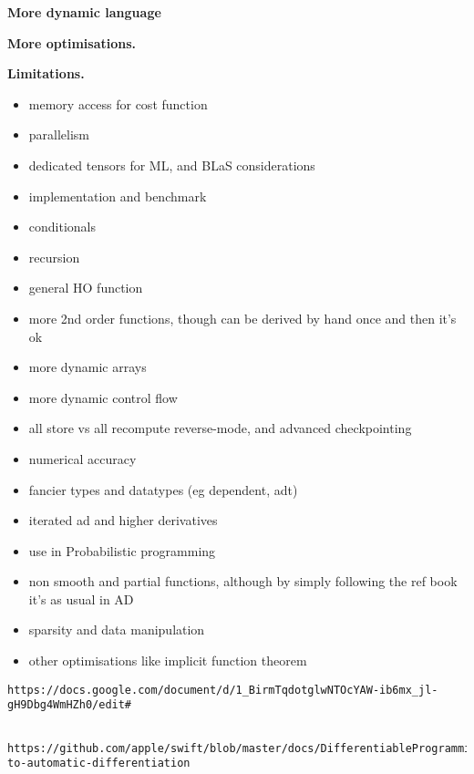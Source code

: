 \noindent \textbf{More dynamic language}

\noindent \textbf{More optimisations.}

\noindent \textbf{Limitations.}
\begin{itemize}
    \item memory access for cost function 
    \item parallelism
    \item dedicated tensors for ML, and BLaS considerations
    \item implementation and benchmark
    \item conditionals
    \item recursion
    \item general HO function
    \item more 2nd order functions, though can be derived by hand once and then it's ok
    \item more dynamic arrays
    \item more dynamic control flow
    \item all store vs all recompute reverse-mode, and advanced checkpointing
    \item numerical accuracy
    \item fancier types and datatypes (eg dependent, adt) 
    \item iterated ad and higher derivatives
    \item use in Probabilistic programming
    \item non smooth and partial functions, although by simply following the ref book it's as usual in AD
    \item sparsity and data manipulation
    \item other optimisations like implicit function theorem
\end{itemize}

\begin{verbatim}https://docs.google.com/document/d/1_BirmTqdotglwNTOcYAW-ib6mx_jl-gH9Dbg4WmHZh0/edit# \end{verbatim}
\begin{verbatim}
	https://github.com/apple/swift/blob/master/docs/DifferentiableProgramming.md#approaches-to-automatic-differentiation
\end{verbatim}


\clearpage